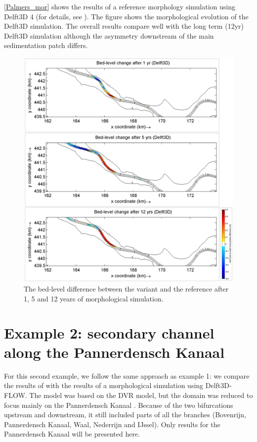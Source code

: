 
\autoref{Palmers_mor} shows the results of a reference morphology simulation using Delft3D 4 (for details, see \citet{GiriJagers2022}).
The figure shows the morphological evolution of the Delft3D simulation.
The overall \dfastmi results compare well with the long term (12yr) Delft3D simulation although the asymmetry downstream of the main sedimentation patch differs.

\begin{figure}[H]
\center
\includegraphics[width=\textwidth]{figures/Palmers_mor.png}
\caption{The bed-level difference between the variant and the reference after 1, 5 and 12 years of morphological simulation.}
\label{Palmers_mor}
\end{figure}


\section{Example 2: secondary channel along the Pannerdensch Kanaal}

For this second example, we follow the same approach as example 1: we compare the results of \dfastmi with the results of a morphological simulation using Delft3D-FLOW.
The model was based on the DVR model, but the domain was reduced to focus mainly on the Pannerdensch Kanaal \citep{BomLeeuwen2020}.
Because of the two bifurcations upstream and downstream, it still included parts of all the branches (Bovenrijn, Pannerdensch Kanaal, Waal, Nederrijn and IJssel).
Only results for the Pannerdensch Kanaal will be presented here.

